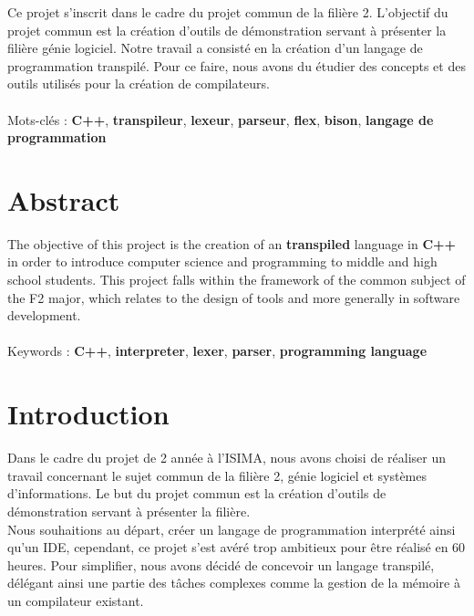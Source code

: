 \documentclass[a4paper]{article}%
\begin{document}
Ce projet s'inscrit dans le cadre du projet commun de la filière 2. L'objectif
du projet commun est la création d'outils de démonstration servant à présenter
la filière génie logiciel. Notre travail a consisté en la création d'un langage
de programmation transpilé. Pour ce faire, nous avons du étudier des concepts et
des outils utilisés pour la création de compilateurs. %
\\~\\

\noindent
Mots-clés : \textbf{C++}, \textbf{transpileur}, \textbf{lexeur},
\textbf{parseur}, \textbf{flex}, \textbf{bison},  \textbf{langage de
programmation}
\\[2\baselineskip]

\section{Abstract}

The objective of this project is the creation of an \textbf{transpiled}
language  in \textbf{C++} in order to introduce computer science and programming
to middle and high school students. This project falls within the framework of
the common subject of the F2 major, which relates to the design of tools and
more generally in software development.
\\~\\

\noindent
Keywords : \textbf{C++}, \textbf{interpreter}, \textbf{lexer}, \textbf{parser},
\textbf{programming language}

\clearpage{}


\section{Introduction}
\large
Dans le cadre du projet de 2 année à l'ISIMA, nous avons choisi de
réaliser un travail concernant le sujet commun de la filière 2, génie logiciel
et systèmes d'informations. Le but du projet commun est la création d'outils de
démonstration servant à présenter la filière.\\

Nous souhaitions au départ, créer un langage de programmation interprété ainsi
qu'un IDE, cependant, ce projet s'est avéré trop ambitieux pour être réalisé en
60 heures. Pour simplifier, nous avons décidé de concevoir un langage transpilé,
délégant ainsi une partie des tâches complexes comme la gestion de la mémoire à
un compilateur existant.\\
\end{document}
